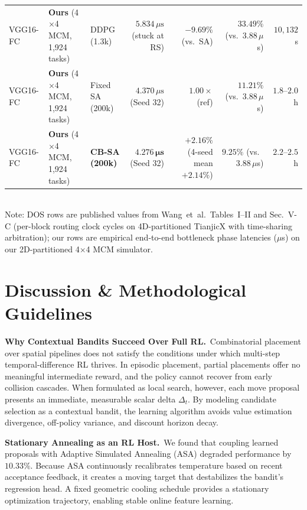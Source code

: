 \documentclass[10pt,conference]{IEEEtran}
\begin{document}
\begin{table}[t]
\begin{tabular}{lllrrrr}
    VGG16-FC & \textbf{Ours} (4$\times$4 MCM, 1,924 tasks) & DDPG (1.3k) & $5.834\,\mu\text{s}$ (stuck at RS) & $-9.69\%$ (vs.\ SA) & $33.49\%$ (vs.\ $3.88\,\mu$s) & $10,132$~s \\
    VGG16-FC & \textbf{Ours} (4$\times$4 MCM, 1,924 tasks) & Fixed SA (200k) & $4.370\,\mu\text{s}$ (Seed 32) & $1.00{\times}$ (ref) & $11.21\%$ (vs.\ $3.88\,\mu$s) & $1.8\text{--}2.0$~h \\
    VGG16-FC & \textbf{Ours} (4$\times$4 MCM, 1,924 tasks) & \textbf{CB-SA (200k)} & $\mathbf{4.276\,\mu\text{s}}$ (Seed 32) & $\mathbf{+2.16\%}$ (4-seed mean $+2.14\%$) & $\mathbf{9.25\%}$ (vs.\ $3.88\,\mu$s) & $2.2\text{--}2.5$~h \\
    \bottomrule
  \end{tabular}
  \vspace{0.5ex}
  \\ \footnotesize{Note: DOS rows are published values from Wang~et~al.\ Tables~I--II and Sec.~V-C (per-block routing clock cycles on 4D-partitioned TianjicX with time-sharing arbitration); our rows are empirical end-to-end bottleneck phase latencies ($\mu$s) on our 2D-partitioned 4$\times$4 MCM simulator.}
\end{table}

\section{Discussion \& Methodological Guidelines}
\label{sec:discussion}

\textbf{Why Contextual Bandits Succeed Over Full RL.}\
Combinatorial placement over spatial pipelines does not satisfy the conditions under which multi-step temporal-difference RL thrives. In episodic placement, partial placements offer no meaningful intermediate reward, and the policy cannot recover from early collision cascades. When formulated as local search, however, each move proposal presents an immediate, measurable scalar delta $\Delta_t$. By modeling candidate selection as a contextual bandit, the learning algorithm avoids value estimation divergence, off-policy variance, and discount horizon decay.

\textbf{Stationary Annealing as an RL Host.}\
We found that coupling learned proposals with Adaptive Simulated Annealing (ASA) degraded performance by $10.33\%$. Because ASA continuously recalibrates temperature based on recent acceptance feedback, it creates a moving target that destabilizes the bandit's regression head. A fixed geometric cooling schedule provides a stationary optimization trajectory, enabling stable online feature learning.
\end{document}
